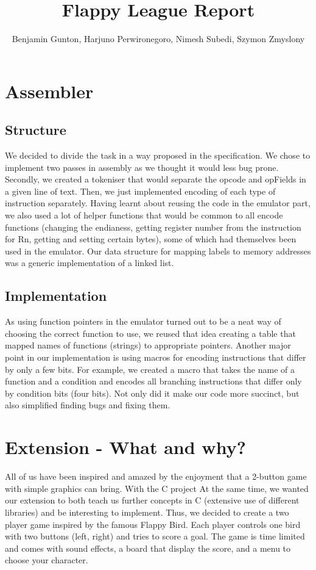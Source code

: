 \documentclass[11pt]{article}
\begin{document}
\title{Flappy League Report}
\author{Benjamin Gunton, Harjuno Perwironegoro, Nimesh Subedi, Szymon Zmyslony}

\maketitle
\section{Assembler}
\subsection{Structure}
 We decided to divide the task in a way proposed in the specification. We chose to implement two passes in assembly as we thought it would less bug prone. Secondly, we created a tokeniser that would separate the opcode and opFields in a given line of text. Then, we just implemented encoding of each type of instruction separately. Having learnt about reusing the code in the emulator part, we also used a lot of helper functions that would be common to all encode functions (changing the endianess, getting register number from the instruction for Rn, getting and setting certain bytes), some of which had themselves been used in the emulator. Our data structure for mapping labels to memory addresses was a generic implementation of a linked list. 
\subsection{Implementation}
As using function pointers in the emulator turned out to be a neat way of choosing the correct function to use, we reused that idea creating a table that mapped names of functions (strings) to appropriate pointers. Another major point in our implementation is using macros for encoding instructions that differ by only a few bits. For example, we created a macro that takes the name of a function and a condition and encodes all branching instructions that differ only by condition bits (four bits). Not only did it make our code more succinct, but also simplified finding bugs and fixing them.
\section{Extension - What and why?}
All of us have been inspired and amazed by the enjoyment that a 2-button game with simple graphics can bring. With the C project At the same time, we wanted our extension to both teach us further concepts in C (extensive use of different libraries) and be interesting to implement. Thus, we decided to create a two player game inspired by the famous Flappy Bird. Each player controls one bird with two buttons (left, right) and tries to score a goal. The game is time limited and comes with sound effects, a board that display the score, and a menu to choose your character.
\end{document}

